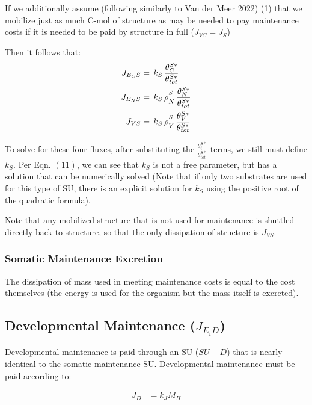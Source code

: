 \documentclass[
]{article}
\begin{document}
If we additionally assume (following similarly to Van der Meer 2022) (1)
that we mobilize just as much C-mol of structure as may be needed to pay
maintenance costs if it is needed to be paid by structure in full
(\(J_{VC} = J_S\))

Then it follows that: \begin{align}
J_{{E_C}S} &= \,k_S\,\frac{\theta^{S*}_C}{\theta^{S*}_{tot}} 
\\
J_{{E_N}S} &= \,k_S\,\rho\strut^S_N\,\frac{\theta^{S*}_N}{\theta^{S*}_{tot}}
\\
J_{VS} &= \,k_S\,\rho\strut^S_V\,\frac{\theta^{S*}_V}{\theta^{S*}_{tot}}
\end{align}

To solve for these four fluxes, after substituting the
\(\frac{\theta^{S*}_i}{\theta^{S*}_{tot}}\) terms, we still must define
\(k_S\). Per Eqn. \((11)\), we can see that \(k_S\) is not a free
parameter, but has a solution that can be numerically solved (Note that
if only two substrates are used for this type of SU, there is an
explicit solution for \(k_S\) using the positive root of the quadratic
formula).

Note that any mobilized structure that is not used for maintenance is
shuttled directly back to structure, so that the only dissipation of
structure is \(J_{VS}\).

\subsubsection{Somatic Maintenance
Excretion}\label{somatic-maintenance-excretion}

The dissipation of mass used in meeting maintenance costs is equal to
the cost themselves (the energy is used for the organism but the mass
itself is excreted).

\newpage

\subsection{\texorpdfstring{Developmental Maintenance
(\(J_{E_{i}D}\))}{Developmental Maintenance (J\_\{E\_\{i\}D\})}}\label{developmental-maintenance-j_e_id}

Developmental maintenance is paid through an SU (\(SU-D\)) that is
nearly identical to the somatic maintenance SU. Developmental
maintenance must be paid according to:

\begin{align}
J_D &= k_{\scriptscriptstyle J}M_H
\end{align}
\end{document}
